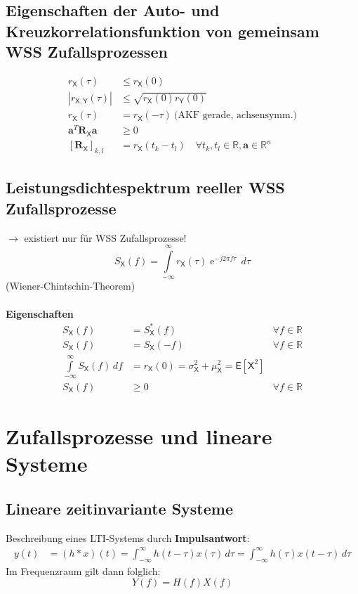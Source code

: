 \documentclass[a4paper,twocolumn,10pt]{article}
\newcommand{\erw}{\mathsf{E}}
\begin{document}
\subsection{Eigenschaften der Auto- und Kreuzkorrelationsfunktion von gemeinsam WSS Zufallsprozessen}
\begin{align}
r_{\mathsf{X}}(\tau) & \leq r_{\mathsf{X}}(0) \nonumber \\
|r_{\mathsf{X,Y}}(\tau)| & \leq \sqrt{r_{\mathsf{X}}(0) r_{\mathsf{Y}}(0)} \nonumber \\
r_{\mathsf{X}}(\tau) & = r_{\mathsf{X}}(- \tau) \ \text{(AKF gerade, achsensymm.)} \nonumber \\
\mathbf{a}^{T}\mathbf{R}_{\mathsf{X}}\mathbf{a} & \geq 0 \nonumber \\
 [ \mathbf{R}_{\mathsf{X}} ]_{k,l} & = r_{\mathsf{X}}(t_{k}-t_{l}) \quad \forall t_{k},t_{l} \in \mathbb{R}, \mathbf{a} \in \mathbb{R}^{n} \nonumber
\end{align}

\subsection{Leistungsdichtespektrum reeller WSS Zufallsprozesse}
$\rightarrow$ existiert nur für WSS Zufallsprozesse!
\[ S_{\mathsf{X}}(f) = \int \limits_{- \infty}^{\infty} r_{\mathsf{X}}(\tau) \operatorname{e}^{-j 2 \pi f \tau} \, d\tau \]
(Wiener-Chintschin-Theorem)\\\\
\textbf{Eigenschaften}
\begin{align}
S_{\mathsf{X}}(f) &= S_{\mathsf{X}}^{*}(f) & \forall f \in \mathbb{R} \nonumber \\
S_{\mathsf{X}}(f) &= S_{\mathsf{X}}(-f) & \forall f \in \mathbb{R} \nonumber \\
 \int \limits_{- \infty}^{\infty} S_{\mathsf{X}}(f) \, df & = r_{\mathsf{X}}(0) = \sigma_{\mathsf{X}}^{2} + \mu_{\mathsf{X}}^{2}=\erw[\mathsf{X}^2] \nonumber \\
S_{\mathsf{X}}(f) & \geq 0 & \forall f \in \mathbb{R} \nonumber
\end{align}

\section{Zufallsprozesse und lineare Systeme}
\subsection{Lineare zeitinvariante Systeme}
Beschreibung eines LTI-Systems durch \textbf{Impulsantwort}:
\begin{align}
y(t) & =  (h \ast x)(t) = \int_{- \infty}^{\infty} h(t - \tau) x(\tau) \, d\tau \nonumber = \int_{- \infty}^{\infty} h(\tau) x(t- \tau) \, d\tau \nonumber
\end{align}
Im Frequenzraum gilt dann folglich:
\[ Y(f) =  H(f)X(f) \]
\end{document}
